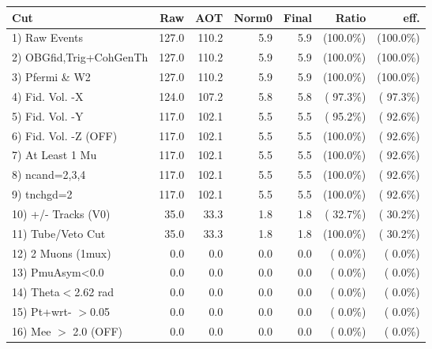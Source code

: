  \begin{table}[h!]\centering
 \begin{tabular}{||l||r|r|r|r|r|r||}
 \hline
 \hline
 Cut & Raw & AOT & Norm0 & Final & Ratio & eff.       \\
 \hline
  1) Raw Events           &        127.0 &        110.2 &          5.9 &          5.9 & (100.0\%) & (100.0\%) \\
  2) OBGfid,Trig+CohGenTh &        127.0 &        110.2 &          5.9 &          5.9 & (100.0\%) & (100.0\%) \\
  3) Pfermi \& W2         &        127.0 &        110.2 &          5.9 &          5.9 & (100.0\%) & (100.0\%) \\
  4) Fid. Vol. -X         &        124.0 &        107.2 &          5.8 &          5.8 & ( 97.3\%) & ( 97.3\%) \\
  5) Fid. Vol. -Y         &        117.0 &        102.1 &          5.5 &          5.5 & ( 95.2\%) & ( 92.6\%) \\
  6) Fid. Vol. -Z (OFF)   &        117.0 &        102.1 &          5.5 &          5.5 & (100.0\%) & ( 92.6\%) \\
  7) At Least 1 Mu        &        117.0 &        102.1 &          5.5 &          5.5 & (100.0\%) & ( 92.6\%) \\
  8) ncand=2,3,4          &        117.0 &        102.1 &          5.5 &          5.5 & (100.0\%) & ( 92.6\%) \\
  9) tnchgd=2             &        117.0 &        102.1 &          5.5 &          5.5 & (100.0\%) & ( 92.6\%) \\
 10) +/- Tracks (V0)      &         35.0 &         33.3 &          1.8 &          1.8 & ( 32.7\%) & ( 30.2\%) \\
 11) Tube/Veto Cut        &         35.0 &         33.3 &          1.8 &          1.8 & (100.0\%) & ( 30.2\%) \\
 12) 2 Muons (1mux)       &          0.0 &          0.0 &          0.0 &          0.0 & (  0.0\%) & (  0.0\%) \\
 13) PmuAsym<0.0          &          0.0 &          0.0 &          0.0 &          0.0 & (  0.0\%) & (  0.0\%) \\
 14) Theta$<$2.62 rad     &          0.0 &          0.0 &          0.0 &          0.0 & (  0.0\%) & (  0.0\%) \\
 15) Pt+wrt- $>$0.05      &          0.0 &          0.0 &          0.0 &          0.0 & (  0.0\%) & (  0.0\%) \\
 16) Mee $>$ 2.0  (OFF)   &          0.0 &          0.0 &          0.0 &          0.0 & (  0.0\%) & (  0.0\%) \\

\end{tabular}
\end{table}
